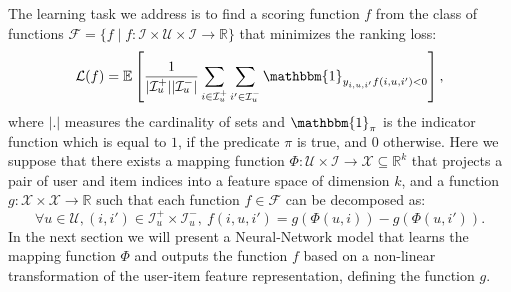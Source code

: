 \documentclass[10pt,journal,compsoc]{IEEEtran}
\newcommand{\userS}{\mathcal{U}}
\newcommand{\itemS}{\mathcal{I}}
\newcommand{\Loss}{\mathcal{L}}
\newcommand{\EE}{\mathbb E}
\newcommand{\Ind}{\mathbbm{1}}
\newcommand{\Input}{\mathcal X}
\newcommand{\R}{\mathbb R}
\begin{document}
\begin{sloppypar}
The learning task we address is to find a scoring function $f$ from the class of functions $\mathcal F=\{f\mid f: \itemS\times\userS\times \itemS\rightarrow \R\}$ that minimizes the ranking loss:
\begin{equation}
\label{eq:PrefObj}
\Loss(f)=\EE\left[\frac{1}{|\itemS^+_u||\itemS^-_u|}\sum_{i\in\itemS^+_u}\sum_{i'\in\itemS^-_u}\Ind_{y_{i,u,i'}f(i,u,i')<0}\right],
\end{equation}
%
where $|.|$ measures the cardinality of sets and $\Ind_{\pi}$ is the indicator function which is equal to $1$, if the predicate $\pi$ is true, and $0$ otherwise. Here we suppose that there exists a mapping function $\Phi:\userS\times\itemS\rightarrow \Input\subseteq \mathbb{R}^k$ that projects a pair of user and item indices into a feature space of dimension $k$, and a function $g:\mathcal X\times \mathcal X\rightarrow \R$ such that each function $f\in\mathcal F$ can be decomposed as:
\begin{equation}
\label{eq:deff}
\forall u\in\userS, (i,i')\in\itemS^+_u\times \itemS^-_u,~ f(i,u,i')=g(\Phi(u,i))-g(\Phi(u,i')).
\end{equation}
In the next section we will present a Neural-Network model that learns the mapping function $\Phi$ and outputs the function $f$ based on a non-linear transformation of the user-item feature representation, defining the function $g$.


\end{sloppypar}
\end{document}
